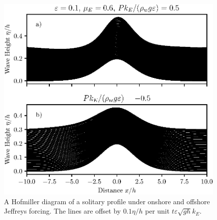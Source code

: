\documentclass{jfm}
\renewcommand*{\epsilon}{\varepsilon}
\begin{document}
\begin{figure}
  \centering
  \includegraphics{Hofmiller.eps}
  \caption{
    A Hofmiller diagram of a solitary profile under onshore and offshore
    Jeffreys forcing.
    The lines are offset by $0.1 \eta/h$ per unit $t \epsilon \sqrt{g h}
    k_E$.
  }
\end{figure}
\end{document}
